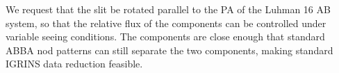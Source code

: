 \documentclass[11pt]{article}
\begin{document}
{{\otherfacilities


%
%

\thepast



%

\technicaldescription


We request that the slit be rotated parallel to the PA of the Luhman 16 AB system, so that the relative flux of the components can be controlled under variable seeing conditions.  The components are close enough that standard ABBA nod patterns can still separate the two components, making standard IGRINS data reduction feasible.


}}
\end{document}

